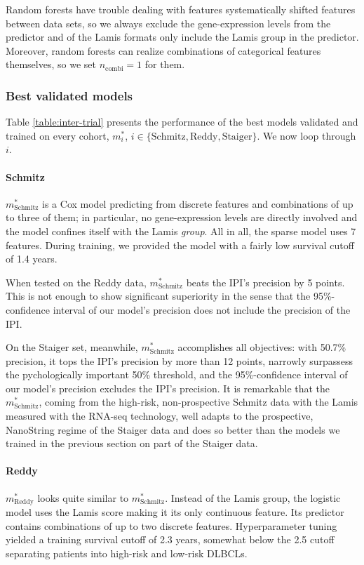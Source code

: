 Random forests have trouble dealing with features systematically shifted features between data sets, so 
we always exclude the gene-expression levels from the predictor and of the Lamis formats only 
include the Lamis group in the predictor. Moreover, random forests can realize combinations of 
categorical features themselves, so we set $n_\text{combi} = 1$ for them.

\subsubsection{Best validated models}

Table \ref{table:inter-trial} presents the performance of the best models validated and trained on 
every cohort, $m_i^*$, $i \in \{ \text{Schmitz}, \text{Reddy}, \text{Staiger} \}$. We now loop 
through $i$.



\paragraph{Schmitz}
$m^*_\text{Schmitz}$ is a Cox model predicting from discrete features and combinations of up to 
three of them; in particular, no gene-expression levels are directly involved and the model confines 
itself with the Lamis \textit{group}. All in all, the sparse model uses \num{7} features. During 
training, we provided the model with a fairly low survival cutoff of \num{1.4} years.

When tested on the Reddy data, $m^*_\text{Schmitz}$ beats the IPI's precision by 5 points. This 
is not enough to show significant superiority in the sense that the \num{95}\%-confidence interval 
of our model's precision does not include the precision of the IPI.

On the Staiger set, meanwhile, $m^*_\text{Schmitz}$ accomplishes all objectives: with 
\num{50.7}\% precision, it tops the IPI's precision by more than 12 points, narrowly surpassess the 
pychologically important \num{50}\% threshold, and the \num{95}\%-confidence interval of our model's 
precision excludes the IPI's precision. It is remarkable that the $m^*_\text{Schmitz}$, coming from 
the high-risk, non-prospective Schmitz data with the Lamis measured with the 
RNA-seq technology, well adapts to the prospective, NanoString regime of the Staiger data and 
does so better than the models we trained in the previous section on part of the Staiger data.

\paragraph{Reddy}
$m^*_\text{Reddy}$ looks quite similar to $m^*_\text{Schmitz}$. Instead of the Lamis group, the 
logistic model uses the Lamis score making it its only continuous feature. Its predictor contains 
combinations of up to two discrete features. Hyperparameter tuning yielded a training survival 
cutoff of \num{2.3} years, somewhat below the \num{2.5} cutoff separating patients into high-risk 
and low-risk DLBCLs. 

